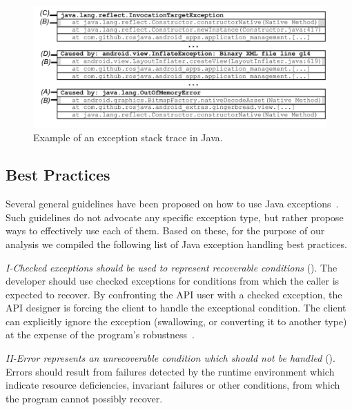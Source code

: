 \begin{figure} \centering \includegraphics[scale=0.55]{stack_review6.png}
\caption{Example of an exception stack trace in Java.}
\label{fig:wrapping}
\end{figure}

\subsection{Best Practices}
\label{sec:best}

Several general guidelines have been proposed on how to use Java
exceptions~\cite{mandrioli1992advances,gosling2000java,wirfs2006toward,
bloch2008effective}. Such guidelines do not
advocate any specific exception type, but rather propose ways to effectively use each of them.
Based on these, for the purpose of our analysis we compiled the following list of Java exception handling best practices.


\emph{I-Checked exceptions should be used to represent recoverable
conditions} (\cite{mandrioli1992advances,gosling2000java,wirfs2006toward,bloch2008effective}).
The developer should use checked exceptions for conditions from which the caller
is expected to recover. By confronting the API user with a checked exception,
the API designer is forcing the client to handle the exceptional condition. The
client can explicitly ignore the exception (swallowing, or converting it to
another type) at the expense of the program's robustness~\cite{gosling2000java}.

\emph{II-Error represents an unrecoverable condition which should not be handled}
(\cite{gosling2000java}).  Errors should result from failures detected
by the runtime environment which indicate resource deficiencies, invariant
failures or other conditions, from which the program cannot possibly recover.


